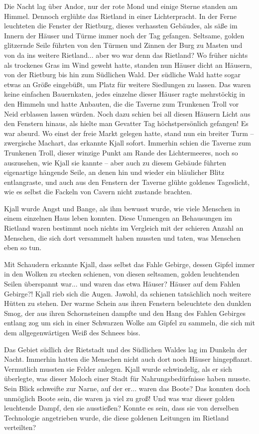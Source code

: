 \documentclass[10pt, a4paper, oneside]{book}
\begin{document}
Die Nacht lag über Andor, nur der rote Mond und einige Sterne standen am Himmel. Dennoch erglühte das Rietland in einer Lichterpracht. In der Ferne leuchteten die Fenster der Rietburg, dieses verhassten Gebäudes, als säße im Innern der Häuser und Türme immer noch der Tag gefangen. Seltsame, golden glitzernde Seile führten von den Türmen und Zinnen der Burg zu Masten und von da ins weitere Rietland... aber wo war denn das Rietland? Wo früher nichts als trockenes Gras im Wind geweht hatte, standen nun Häuser dicht an Häusern, von der Rietburg bis hin zum Südlichen Wald. Der südliche Wald hatte sogar etwas an Größe eingebüßt, um Platz für weitere Siedlungen zu lassen. Das waren keine einfachen Bauernkaten, jedes einzelne dieser Häuser ragte mehrstöckig in den Himmeln und hatte Anbauten, die die Taverne zum Trunkenen Troll vor Neid erblassen lassen würden. Noch dazu schien bei all diesen Häusern Licht aus den Fenstern hinaus, als hielte man Gevatter Tag höchstpersönlich gefangen! Es war absurd. Wo einst der freie Markt gelegen hatte, stand nun ein breiter Turm – zwergische Machart, das erkannte Kjall sofort. Immerhin schien die Taverne zum Trunkenen Troll, dieser winzige Punkt am Rande des Lichtermeeres, noch so auszusehen, wie Kjall sie kannte – aber auch zu diesem Gebäude führten eigenartige hängende Seile, an denen hin und wieder ein bläulicher Blitz entlangraste, und auch aus den Fenstern der Taverne glühte goldenes Tageslicht, wie es selbst die Fackeln von Cavern nicht zustande brachten.

Kjall wurde Angst und Bange, als ihm bewusst wurde, wie viele Menschen in einem einzelnen Haus leben konnten. Diese Unmengen an Behausungen im Rietland waren bestimmt noch nichts im Vergleich mit der schieren Anzahl an Menschen, die sich dort versammelt haben mussten und taten, was Menschen eben so tun.

Mit Schaudern erkannte Kjall, dass selbst das Fahle Gebirge, dessen Gipfel immer in den Wolken zu stecken schienen, von diesen seltsamen, golden leuchtenden Seilen überspannt war... und waren das etwa Häuser? Häuser auf dem Fahlen Gebirge?! Kjall rieb sich die Augen. Jawohl, da schienen tatsächlich noch weitere Hütten zu stehen. Der warme Schein aus ihren Fenstern beleuchtete den dunklen Smog, der aus ihren Schornsteinen dampfte und den Hang des Fahlen Gebirges entlang zog um sich in einer Schwarzen Wolke am Gipfel zu sammeln, die sich mit dem allgegenwärtigen Weiß des Schnees biss.

Das Gebiet südlich der Rietstadt und des Südlichen Waldes lag im Dunkeln der Nacht. Immerhin hatten die Menschen nicht auch dort noch Häuser hingepflanzt. Vermutlich mussten sie Felder anlegen. Kjall wurde schwindelig, als er sich überlegte, was dieser Moloch einer Stadt für Nahrungsbedürfnisse haben musste. Sein Blick schweifte zur Narne, auf der er... waren das Boote? Das konnten doch unmöglich Boote sein, die waren ja viel zu groß! Und was war dieser golden leuchtende Dampf, den sie ausstießen? Konnte es sein, dass sie von derselben Technologie angetrieben wurde, die diese goldenen Leitungen im Rietland verteilten?
\end{document}
